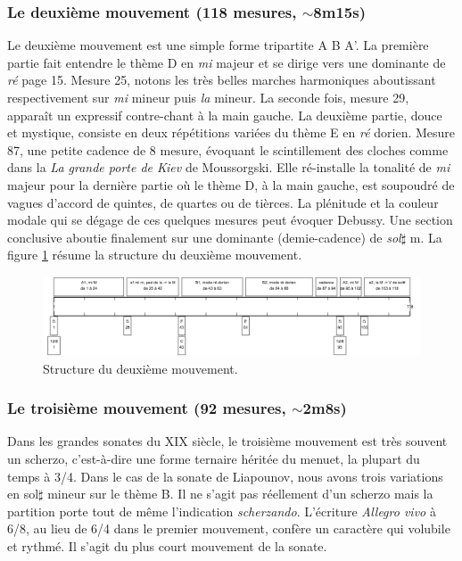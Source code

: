 \subsubsection*{Le deuxième mouvement (118 mesures, $\sim$8m15s)}

Le deuxième mouvement est une simple forme tripartite A B A'. La première partie fait entendre le thème D en \emph{mi} majeur et se dirige vers une dominante de \emph{ré} page 15. Mesure 25, notons les très belles marches harmoniques aboutissant respectivement sur \emph{mi} mineur puis \emph{la} mineur. La seconde fois, mesure 29, apparaît un expressif contre-chant à la main gauche. La deuxième partie, douce et mystique, consiste en deux répétitions variées du thème E en \emph{ré} dorien. Mesure 87, une petite cadence de 8 mesure, évoquant le scintillement des cloches comme dans la \emph{La grande porte de Kiev} de Moussorgski. Elle ré-installe la tonalité de \emph{mi} majeur pour la dernière partie où le thème D, à la main gauche, est soupoudré de vagues d'accord de quintes, de quartes ou de tièrces. La plénitude et la couleur modale qui se dégage de ces quelques mesures peut évoquer Debussy. Une section conclusive aboutie finalement sur une dominante (demie-cadence) de \emph{sol}$\sharp$ m. La figure \ref{schema-2} résume la structure du deuxième mouvement.

\begin{figure}[!ht]
  \begin{bigcenter}
    \includegraphics[width=17.5cm, keepaspectratio]{frise-mvt2.png}
  \end{bigcenter}
  \caption{\label{schema-2}Structure du deuxième mouvement.}
\end{figure}

\subsubsection*{Le troisième mouvement (92 mesures, $\sim$2m8s)}

Dans les grandes sonates du XIX\ieme{} siècle, le troisième mouvement est très souvent un scherzo, c'est-à-dire une forme ternaire héritée du menuet, la plupart du temps à 3/4. Dans le cas de la sonate de Liapounov, nous avons trois variations en sol$\sharp$ mineur sur le thème B. Il ne s'agit pas réellement d'un scherzo mais la partition porte tout de même l'indication \emph{scherzando}. L'écriture \emph{Allegro vivo} à 6/8, au lieu de 6/4 dans le premier mouvement, confère un caractère qui volubile et rythmé. Il s'agit du plus court mouvement de la sonate.


